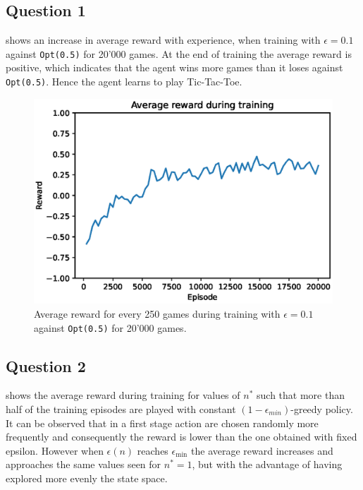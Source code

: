 \documentclass[10pt]{IEEEtran}
\begin{document}
\subsection*{Question 1}
 shows an increase in average reward with experience, when training with $\epsilon = 0.1$ against \texttt{Opt(0.5)} for 20'000 games. At the end of training the average reward is positive, which indicates that the agent wins more games than it loses against \texttt{Opt(0.5)}. Hence the agent learns to play Tic-Tac-Toe. 
\begin{figure}[H]
    \centering
    \includegraphics[width = 0.85\linewidth]{code/figures/rewards_Q1.eps}
    \caption{Average reward for every 250 games during training with $\epsilon = 0.1$ against \texttt{Opt(0.5)} for 20'000 games.}
    \label{plot_question1}
\end{figure}

\subsection*{Question 2}
 shows the average reward during training for values of $n^{*}$ such that more than half of the training episodes are played with constant $(1-\epsilon_{min})$-greedy policy. It can be observed that in a first stage action are chosen randomly more frequently and consequently the reward is lower than the one obtained with fixed epsilon. However when $\epsilon(n)$ reaches $\epsilon_{\text{min}}$ the average reward increases and approaches the same values seen for $n^{*} = 1$, but with the advantage of having explored more evenly the state space. 
\end{document}
